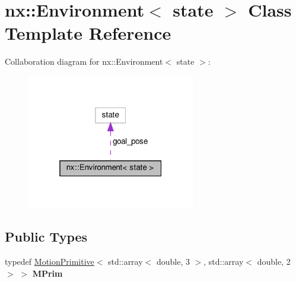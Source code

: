 \hypertarget{classnx_1_1Environment}{}\section{nx\+:\+:Environment$<$ state $>$ Class Template Reference}
\label{classnx_1_1Environment}


Collaboration diagram for nx\+:\+:Environment$<$ state $>$\+:
\nopagebreak
\begin{figure}[H]
\begin{center}
\leavevmode
\includegraphics[width=208pt]{classnx_1_1Environment__coll__graph}
\end{center}
\end{figure}
\subsection*{Public Types}
\begin{DoxyCompactItemize}
\item 
\mbox{\label{classnx_1_1Environment_a989675f3a115e396a169841ea96697c7}} 
typedef \hyperlink{structnx_1_1MotionPrimitive}{Motion\+Primitive}$<$ std\+::array$<$ double, 3 $>$, std\+::array$<$ double, 2 $>$ $>$ {\bfseries M\+Prim}
\end{DoxyCompactItemize}
